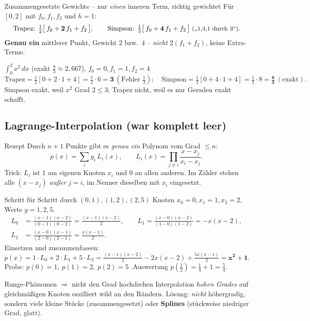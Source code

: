\documentclass[a4paper,11pt]{article}
\begin{document}
\begin{falle}{Zusammengesetzte Gewichte -- nur \emph{einen} inneren Term, richtig gewichtet}
Für $[0,2]$ mit $f_0,f_1,f_2$ und $h=1$:
\[
  \text{Trapez: } \tfrac12\bigl[\,f_0+\mathbf{2}\,f_1+f_2\,\bigr],\qquad
  \text{Simpson: } \tfrac13\bigl[\,f_0+\mathbf{4}\,f_1+f_2\,\bigr]\;\text{\small(„1,4,1 durch 3``)}.
\]
\textbf{Genau ein} mittlerer Punkt, Gewicht $2$ bzw.\ $4$ -- \emph{nicht} $2(f_1{+}f_2)$, keine
Extra-Terme.
\end{falle}

\begin{bsp}{$\displaystyle\int_0^2 x^2\,dx$ (exakt $\tfrac83\approx2{,}667$), $f_0{=}0,f_1{=}1,f_2{=}4$}
\[
\text{Trapez}=\tfrac12[0+2\cdot1+4]=\tfrac12\cdot6=\mathbf{3}\ (\text{Fehler }\tfrac13);\quad
\text{Simpson}=\tfrac13[0+4\cdot1+4]=\tfrac13\cdot8=\mathbf{\tfrac83}\ (\text{exakt}).
\]
Simpson exakt, weil $x^2$ Grad $2\le 3$; Trapez nicht, weil es nur Geraden exakt schafft.
\end{bsp}

\subsection{Lagrange-Interpolation (war komplett leer)}
\begin{satz}{Rezept}
Durch $n{+}1$ Punkte gibt es \emph{genau ein} Polynom vom Grad $\le n$:
\[
  p(x)=\sum_i y_i\,L_i(x),\qquad
  L_i(x)=\prod_{j\neq i}\frac{x-x_j}{x_i-x_j}.
\]
Trick: $L_i$ ist $1$ am eigenen Knoten $x_i$ und $0$ an allen anderen. Im Zähler stehen alle
$(x-x_j)$ \emph{außer} $j{=}i$, im Nenner dieselben mit $x_i$ eingesetzt.
\end{satz}

\begin{bsp}{Schritt für Schritt durch $(0,1),(1,2),(2,5)$}
Knoten $x_0{=}0,x_1{=}1,x_2{=}2$, Werte $y=1,2,5$.
\begin{align*}
L_0&=\frac{(x-1)(x-2)}{(0-1)(0-2)}=\frac{(x-1)(x-2)}{2},\qquad
L_1=\frac{(x-0)(x-2)}{(1-0)(1-2)}=-x(x-2),\\
L_2&=\frac{(x-0)(x-1)}{(2-0)(2-1)}=\frac{x(x-1)}{2}.
\end{align*}
Einsetzen und zusammenfassen:
\[
p(x)=1\!\cdot\!L_0+2\!\cdot\!L_1+5\!\cdot\!L_2
=\tfrac{(x-1)(x-2)}{2}-2x(x-2)+\tfrac{5x(x-1)}{2}=\mathbf{x^2+1}.
\]
Probe: $p(0)=1,\ p(1)=2,\ p(2)=5$ \checkmark.\quad Auswertung $p(\tfrac12)=\tfrac14+1=\tfrac54$.
\end{bsp}

\begin{falle}{Runge-Phänomen $\Rightarrow$ nicht den Grad hochdrehen}
Interpolation \emph{hohen Grades} auf gleichmäßigen Knoten oszilliert wild an den Rändern. Lösung:
\emph{nicht} höhergradig, sondern viele kleine Stücke (zusammengesetzt) oder \textbf{Splines}
(stückweise niedriger Grad, glatt).
\end{falle}
\end{document}
